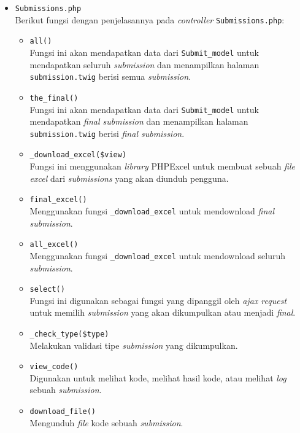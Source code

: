 \begin{itemize}
\begin{itemize}
\begin{itemize}
	      \end{itemize}

	\item \verb|Submissions.php| \\
	      Berikut fungsi dengan penjelasannya pada \textit{controller} \verb|Submissions.php|:

	      \begin{itemize}
		      \item \verb|all()| \\
		            Fungsi ini akan mendapatkan data dari \verb|Submit_model| untuk mendapatkan seluruh \textit{submission} dan menampilkan halaman \verb|submission.twig| berisi semua \textit{submission}. 

		      \item \verb|the_final()| \\
		            Fungsi ini akan mendapatkan data dari \verb|Submit_model| untuk mendapatkan \textit{final submission} dan menampilkan halaman \verb|submission.twig| berisi \textit{final submission}.
		            
		      \item \verb|_download_excel($view)| \\
		            Fungsi ini menggunakan \textit{library} PHPExcel untuk membuat sebuah \textit{file excel} dari \textit{submissions} yang akan diunduh pengguna.
		      \item \verb|final_excel()| \\
		            Menggunakan fungsi \verb|_download_excel| untuk mendownload \textit{final submission}.
		      \item \verb|all_excel()| \\
		            Menggunakan fungsi \verb|_download_excel| untuk mendownload seluruh \textit{submission}.
		      \item \verb|select()| \\
		            Fungsi ini digunakan sebagai fungsi yang dipanggil oleh \textit{ajax request} untuk memilih \textit{submission} yang akan dikumpulkan atau menjadi \textit{final}.
		      \item \verb|_check_type($type)| \\
		            Melakukan validasi tipe \textit{submission} yang dikumpulkan.
		      \item \verb|view_code()| \\
		            Digunakan untuk melihat kode, melihat hasil kode, atau melihat \textit{log} sebuah \textit{submission}.
		      \item \verb|download_file()| \\
		            Mengunduh \textit{file} kode sebuah \textit{submission}.
	      \end{itemize}


\end{itemize}
\end{itemize}
